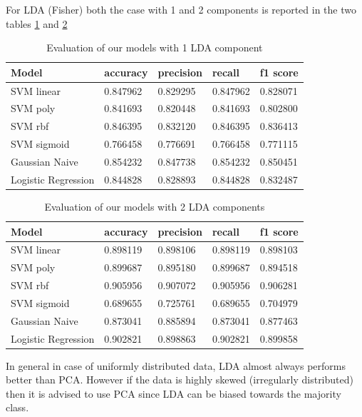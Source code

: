 \documentclass[a4paper,12pt]{article}
\begin{document}
For LDA (Fisher) both the case with 1 and 2 components is reported in the two tables \ref{tab:lda1} and \ref{tab:lda2}
\begin{table}[H]
\begin{tabular}{ |p{4cm}||p{3cm}|p{3cm}|p{3cm}|p{3cm}| }
  \hline
  Model& accuracy & precision  &  recall & f1 score \\
  \hline
  SVM linear&           0.847962&   0.829295&  0.847962&  0.828071\\
  SVM poly  &           0.841693&   0.820448&  0.841693&  0.802800\\
  SVM rbf   &           0.846395&   0.832120&  0.846395&  0.836413\\
  SVM sigmoid &         0.766458&   0.776691&  0.766458&  0.771115\\
  Gaussian Naive  &        0.854232&   0.847738&  0.854232&  0.850451\\
  Logistic Regression & 0.844828&   0.828893&  0.844828&  0.832487\\
  \hline
\end{tabular}
\caption{Evaluation of our models with 1 LDA component}
\label{tab:lda1}
\end{table}

\begin{table}[H]
\begin{tabular}{ |p{4cm}||p{3cm}|p{3cm}|p{3cm}|p{3cm}| }
  \hline
  Model& accuracy & precision  &  recall & f1 score \\
  \hline
  SVM linear &          0.898119&   0.898106&  0.898119&  0.898103\\
  SVM poly   &          0.899687&   0.895180&  0.899687&  0.894518\\
  SVM rbf    &          0.905956&   0.907072&  0.905956&  0.906281\\
  SVM sigmoid &         0.689655&   0.725761&  0.689655&  0.704979\\
  Gaussian Naive &         0.873041&   0.885894&  0.873041&  0.877463\\
  Logistic Regression&  0.902821&   0.898863&  0.902821&  0.899858\\
  \hline
\end{tabular}
\caption{Evaluation of our models with 2 LDA components}
\label{tab:lda2}
\end{table}


\noindent In general in case of uniformly distributed data, LDA almost always performs better than PCA. However if the data is highly skewed (irregularly distributed) then it is advised to use PCA since LDA can be biased towards the majority class.
\end{document}
